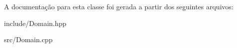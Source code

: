 A documentação para esta classe foi gerada a partir dos seguintes arquivos\+:\begin{DoxyCompactItemize}
\item 
include/Domain.\+hpp\item 
src/Domain.\+cpp\end{DoxyCompactItemize}
